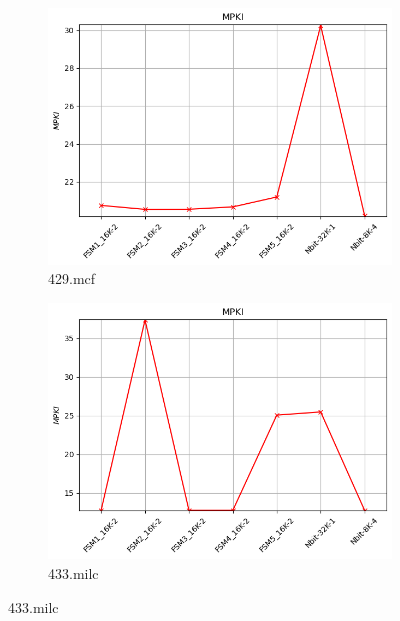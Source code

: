 \documentclass{article}
\begin{document}
\begin{figure}[H]
    \centering
    \ContinuedFloat

    \begin{subfigure}[b]{0.45\textwidth}
        \includegraphics[width=\textwidth]{figures/5_3_c/429.mcf.cslab_branch_preds_ref.out.png}
        \caption{429.mcf}
        \label{fig:plot37}
    \end{subfigure}
    \hfill
    \begin{subfigure}[b]{0.45\textwidth}
        \includegraphics[width=\textwidth]{figures/5_3_c/433.milc.cslab_branch_preds_ref.out.png}
        \caption{433.milc}
        \label{fig:plot38}
    \end{subfigure}


\end{figure}
\end{document}
